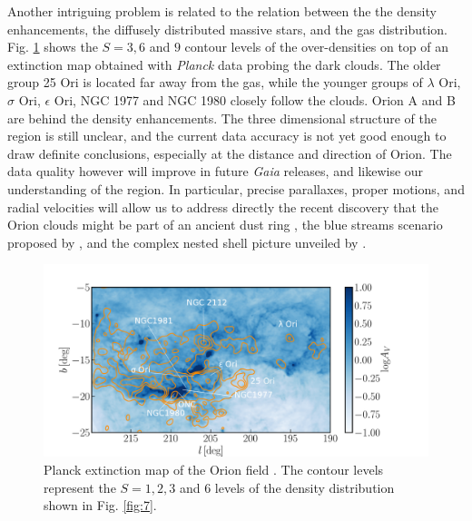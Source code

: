 \documentclass[twocolumn]{aa}
\begin{document}
 

Another intriguing problem is related to the relation between the the density enhancements, the diffusely distributed massive stars, and the gas distribution. 
Fig. \ref{fig:16} shows the $S = 3, 6$ and $9$ contour levels of the over-densities on top of an extinction map obtained with \textit{Planck} data \citep{Planck2014} probing the dark clouds. The older group 25 Ori is located far away from the gas, while the younger groups of $\lambda$ Ori, $\sigma$ Ori, $\epsilon$ Ori, NGC 1977 and NGC 1980 closely follow the clouds. Orion A and B are behind the density enhancements.
The three dimensional structure of the region is still unclear, and the current data accuracy is not yet good enough to draw definite conclusions, especially at the distance and direction of Orion. The data quality however will improve  in future \textit{Gaia} releases, and likewise our understanding of the region. In particular, precise parallaxes, proper motions, and radial velocities will allow us to address directly the recent discovery that the Orion clouds might be part of an ancient dust ring \citep{Schlafly2015}, the blue streams scenario proposed by \cite{Bouy2015}, and the complex nested shell picture unveiled by \cite{Ochsendorf2015}.


\begin{figure}
\includegraphics[width = \hsize]{fig14_labels.pdf}
\caption{Planck extinction map of the Orion field \citep{Planck2014}. The contour levels represent the $S = 1,2,3$ and 6 levels of the density distribution shown in Fig. \ref{fig:7}.}
\label{fig:16}
\end{figure}
\end{document}
